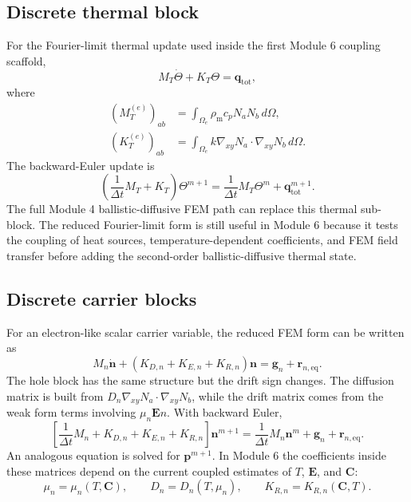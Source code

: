 \documentclass[11pt]{article}
\newcommand{\Evec}{\bm{E}}
\newcommand{\Cvec}{\bm{C}}
\newcommand{\gradxy}{\nabla_{xy}}
\newcommand{\dt}{\Delta t}
\newcommand{\rhom}{\rho_{\mathrm{m}}}
\newcommand{\cpsym}{c_{p}}
\begin{document}
\subsection{Discrete thermal block}

For the Fourier-limit thermal update used inside the first Module 6 coupling scaffold,
\begin{equation}
M_T\dot{\Theta}+K_T\Theta=\mathbf{q}_{\mathrm{tot}},
\end{equation}
where
\begin{align}
(M_T^{(e)})_{ab} &= \int_{\Omega_e}\rhom\cpsym N_aN_b\,d\Omega,\\
(K_T^{(e)})_{ab} &= \int_{\Omega_e}k\gradxy N_a\cdot\gradxy N_b\,d\Omega.
\end{align}
The backward-Euler update is
\begin{equation}
\boxed{
\left(\frac{1}{\dt}M_T+K_T\right)\Theta^{m+1}
=
\frac{1}{\dt}M_T\Theta^m+
\mathbf{q}_{\mathrm{tot}}^{m+1}.}
\label{eq:module6_thermal_be}
\end{equation}
The full Module 4 ballistic-diffusive FEM path can replace this thermal sub-block. The reduced Fourier-limit form is still useful in Module 6 because it tests the coupling of heat sources, temperature-dependent coefficients, and FEM field transfer before adding the second-order ballistic-diffusive thermal state.

\subsection{Discrete carrier blocks}

For an electron-like scalar carrier variable, the reduced FEM form can be written as
\begin{equation}
\boxed{
M_n\dot{\mathbf{n}}+
\left(K_{D,n}+K_{E,n}+K_{R,n}\right)\mathbf{n}
=
\mathbf{g}_n+\mathbf{r}_{n,\mathrm{eq}}.}
\label{eq:module6_electron_discrete}
\end{equation}
The hole block has the same structure but the drift sign changes. The diffusion matrix is built from \(D_n\gradxy N_a\cdot\gradxy N_b\), while the drift matrix comes from the weak form terms involving \(\mu_n\Evec n\). With backward Euler,
\begin{equation}
\boxed{
\left[\frac{1}{\dt}M_n+K_{D,n}+K_{E,n}+K_{R,n}\right]\mathbf{n}^{m+1}
=
\frac{1}{\dt}M_n\mathbf{n}^{m}+\mathbf{g}_n+\mathbf{r}_{n,\mathrm{eq}}.}
\label{eq:module6_electron_be}
\end{equation}
An analogous equation is solved for \(\mathbf{p}^{m+1}\). In Module 6 the coefficients inside these matrices depend on the current coupled estimates of \(T\), \(\Evec\), and \(\Cvec\):
\begin{equation}
\mu_n=\mu_n(T,\Cvec),
\qquad
D_n=D_n(T,\mu_n),
\qquad
K_{R,n}=K_{R,n}(\Cvec,T).
\end{equation}
\end{document}
